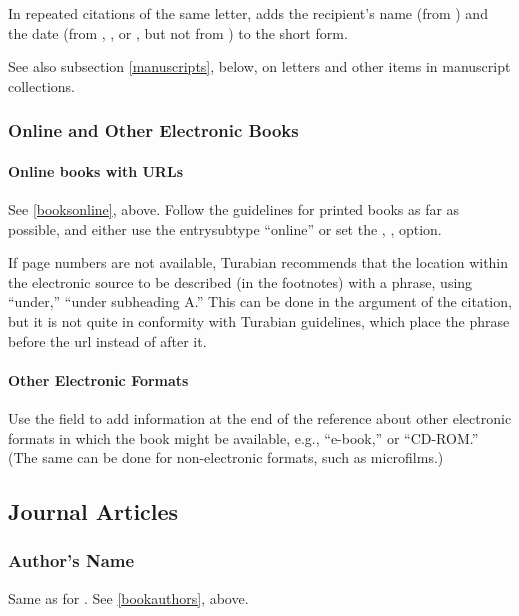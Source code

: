 \documentclass{ltxdockit}[2010/02/12]
\begin{document}
In repeated citations of the same letter,  adds the recipient's name (from ) and the date (from , , or , but not from ) to the short form.\autocites[][]{2319y} 

See also subsection \ref{manuscripts}, below, on letters and other items in manuscript collections.


\subsubsection{Online and Other Electronic Books\label{onlinebooks}}
\paragraph{Online books with URLs}
See \ref{booksonline}, above. Follow the guidelines for printed books as far as possible, and either use the entrysubtype ``online'' or set the , ,  option.

If page numbers are not available, Turabian recommends that the location within the electronic source to be described (in the footnotes) with a phrase, using ``under,'' \eg ``under subheading A.'' This can be done in the  argument of the citation, but it is not quite in conformity with Turabian guidelines, which place the phrase before the url instead of after it.

\paragraph{Other Electronic Formats}
Use the  field to add information at the end of the reference about other electronic formats in which the book might be available, e.g., ``e-book,'' or ``CD-ROM.'' (The same can be done for non-electronic formats, such as microfilms.)\autocites[][]{haeckel1912the-evolution-o}


\subsection{Journal Articles}

\subsubsection{Author's Name}

Same as for . See \ref{bookauthors}, above.
\end{document}
